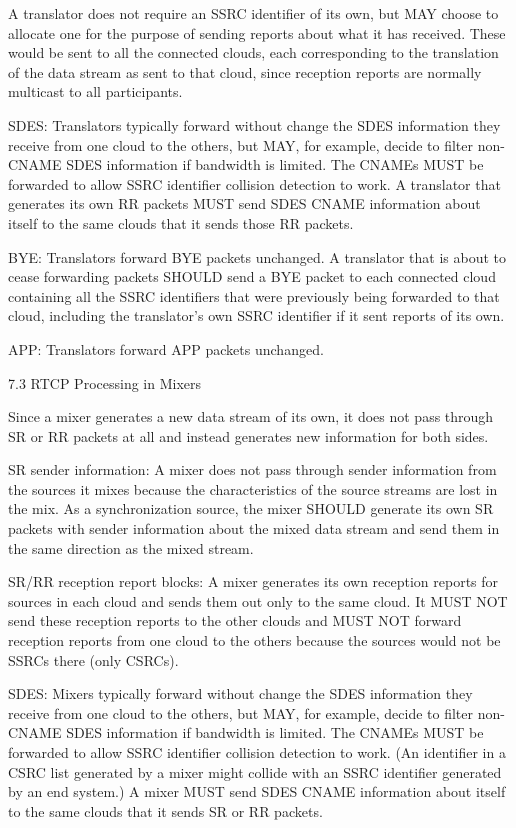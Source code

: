 \documentclass{article}
\begin{document}
A translator does not require an SSRC identifier of its own, but MAY choose to allocate one for the purpose of sending reports about what it has received.  These would be sent to all the connected clouds, each corresponding to the translation of the data stream as sent to that cloud, since reception reports are normally multicast to all participants.

SDES:  Translators typically forward without change the SDES information they receive from one cloud to the others, but MAY, for example, decide to filter non-CNAME SDES information if bandwidth is limited.  The CNAMEs MUST be forwarded to allow SSRC identifier collision detection to work.  A translator that generates its own RR packets MUST send SDES CNAME information about itself to the same clouds that it sends those RR packets.

BYE:  Translators forward BYE packets unchanged.  A translator that is about to cease forwarding packets SHOULD send a BYE packet to each connected cloud containing all the SSRC identifiers that were previously being forwarded to that cloud, including the translator's own SSRC identifier if it sent reports of its own.

APP:  Translators forward APP packets unchanged.

7.3 RTCP Processing in Mixers

Since a mixer generates a new data stream of its own, it does not pass through SR or RR packets at all and instead generates new information for both sides.

SR sender information:  A mixer does not pass through sender information from the sources it mixes because the characteristics of the source streams are lost in the mix.  As a synchronization source, the mixer SHOULD generate its own SR packets with sender information about the mixed data stream and send them in the same direction as the mixed stream.

SR/RR reception report blocks:  A mixer generates its own reception reports for sources in each cloud and sends them out only to the same cloud.  It MUST NOT send these reception reports to the other clouds and MUST NOT forward reception reports from one cloud to the others because the sources would not be SSRCs there (only CSRCs).

SDES:  Mixers typically forward without change the SDES information they receive from one cloud to the others, but MAY, for example, decide to filter non-CNAME SDES information if bandwidth is limited.  The CNAMEs MUST be forwarded to allow SSRC identifier collision detection to work.  (An identifier in a CSRC list generated by a mixer might collide with an SSRC identifier generated by an end system.)  A mixer MUST send SDES CNAME information about itself to the same clouds that it sends SR or RR packets.
\end{document}
